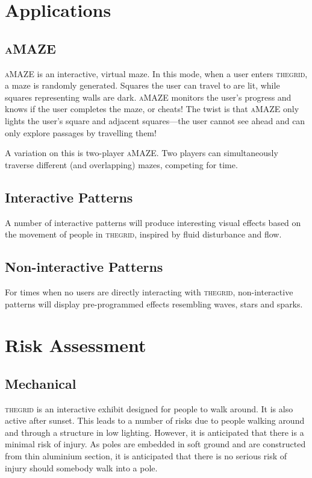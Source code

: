 \documentclass[12pt]{article} %
\newcommand{\thegrid}{\textsc{the\textperiodcentered grid}\xspace}
\newcommand{\amaze}{\textsc{aMAZE}\xspace}
\begin{document}
\section{Applications}
\subsection{\amaze}
\amaze is an interactive, virtual maze.  In this mode, when a user enters
\thegrid, a maze is randomly generated.  Squares the user can travel to are
lit, while squares representing walls are dark.  \amaze monitors the user's
progress and knows if the user completes the maze, or cheats!  The twist is
that \amaze only lights the user's square and adjacent squares---the user
cannot see ahead and can only explore passages by travelling them!

A variation on this is two-player \amaze.  Two players can simultaneously
traverse different (and overlapping) mazes, competing for time.

\subsection{Interactive Patterns}
A number of interactive patterns will produce interesting visual effects based
on the movement of people in \thegrid, inspired by fluid disturbance and flow.

\subsection{Non-interactive Patterns}
For times when no users are directly interacting with \thegrid, non-interactive
patterns will display pre-programmed effects resembling waves, stars and
sparks.

\clearpage
\section{Risk Assessment}
\subsection{Mechanical}
\thegrid is an interactive exhibit designed for people to walk around.  It is
also active after sunset.  This leads to a number of risks due to people
walking around and through a structure in low lighting.  However, it is
anticipated that there is a minimal risk of injury.  As poles are embedded in
soft ground and are constructed from thin aluminium section, it is anticipated
that there is no serious risk of injury should somebody walk into a pole.
\end{document}
